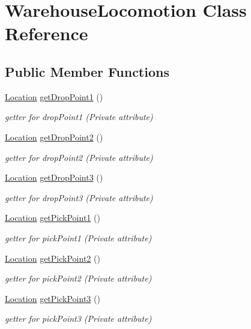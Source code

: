 \hypertarget{classWarehouseLocomotion}{}\section{Warehouse\+Locomotion Class Reference}
\label{classWarehouseLocomotion}
\subsection*{Public Member Functions}
\begin{DoxyCompactItemize}
\item 
\hyperlink{structLocation}{Location} \hyperlink{classWarehouseLocomotion_ac8160b4598a6a1630042b552b2f3ed60}{get\+Drop\+Point1} ()
\begin{DoxyCompactList}\small\item\em getter for drop\+Point1 (Private attribute) \end{DoxyCompactList}\item 
\hyperlink{structLocation}{Location} \hyperlink{classWarehouseLocomotion_a56b5e1c3d35d6047deb9c4999f95f73f}{get\+Drop\+Point2} ()
\begin{DoxyCompactList}\small\item\em getter for drop\+Point2 (Private attribute) \end{DoxyCompactList}\item 
\hyperlink{structLocation}{Location} \hyperlink{classWarehouseLocomotion_ae9f000ef807c13d276840469168d1d14}{get\+Drop\+Point3} ()
\begin{DoxyCompactList}\small\item\em getter for drop\+Point3 (Private attribute) \end{DoxyCompactList}\item 
\hyperlink{structLocation}{Location} \hyperlink{classWarehouseLocomotion_a7d674841f003f5a574089ab53e953034}{get\+Pick\+Point1} ()
\begin{DoxyCompactList}\small\item\em getter for pick\+Point1 (Private attribute) \end{DoxyCompactList}\item 
\hyperlink{structLocation}{Location} \hyperlink{classWarehouseLocomotion_afae7b5b08339ee9bef1c659a2fb7e355}{get\+Pick\+Point2} ()
\begin{DoxyCompactList}\small\item\em getter for pick\+Point2 (Private attribute) \end{DoxyCompactList}\item 
\hyperlink{structLocation}{Location} \hyperlink{classWarehouseLocomotion_a7662c9146e86c18cf3c75dfeb525e9e5}{get\+Pick\+Point3} ()
\begin{DoxyCompactList}\small\item\em getter for pick\+Point3 (Private attribute) \end{DoxyCompactList}\end{DoxyCompactItemize}


